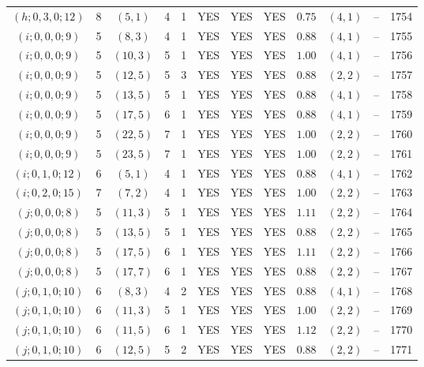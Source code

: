 \begin{longtable}{|c|c|c|c|c|c|c|c|c|c|c|c|}
$(h;0,3,0;12)$ & 8 & $(5,1)$ & 4 & 1 & YES & YES & YES & $0.75$ & $(4,1)$ & -- & 1754\\
$(i;0,0,0;9)$ & 5 & $(8,3)$ & 4 & 1 & YES & YES & YES & $0.88$ & $(4,1)$ & -- & 1755\\
$(i;0,0,0;9)$ & 5 & $(10,3)$ & 5 & 1 & YES & YES & YES & $1.00$ & $(4,1)$ & -- & 1756\\
$(i;0,0,0;9)$ & 5 & $(12,5)$ & 5 & 3 & YES & YES & YES & $0.88$ & $(2,2)$ & -- & 1757\\
$(i;0,0,0;9)$ & 5 & $(13,5)$ & 5 & 1 & YES & YES & YES & $0.88$ & $(4,1)$ & -- & 1758\\
$(i;0,0,0;9)$ & 5 & $(17,5)$ & 6 & 1 & YES & YES & YES & $0.88$ & $(4,1)$ & -- & 1759\\
$(i;0,0,0;9)$ & 5 & $(22,5)$ & 7 & 1 & YES & YES & YES & $1.00$ & $(2,2)$ & -- & 1760\\
$(i;0,0,0;9)$ & 5 & $(23,5)$ & 7 & 1 & YES & YES & YES & $1.00$ & $(2,2)$ & -- & 1761\\
$(i;0,1,0;12)$ & 6 & $(5,1)$ & 4 & 1 & YES & YES & YES & $0.88$ & $(4,1)$ & -- & 1762\\
$(i;0,2,0;15)$ & 7 & $(7,2)$ & 4 & 1 & YES & YES & YES & $1.00$ & $(2,2)$ & -- & 1763\\
$(j;0,0,0;8)$ & 5 & $(11,3)$ & 5 & 1 & YES & YES & YES & $1.11$ & $(2,2)$ & -- & 1764\\
$(j;0,0,0;8)$ & 5 & $(13,5)$ & 5 & 1 & YES & YES & YES & $0.88$ & $(2,2)$ & -- & 1765\\
$(j;0,0,0;8)$ & 5 & $(17,5)$ & 6 & 1 & YES & YES & YES & $1.11$ & $(2,2)$ & -- & 1766\\
$(j;0,0,0;8)$ & 5 & $(17,7)$ & 6 & 1 & YES & YES & YES & $0.88$ & $(2,2)$ & -- & 1767\\
$(j;0,1,0;10)$ & 6 & $(8,3)$ & 4 & 2 & YES & YES & YES & $0.88$ & $(4,1)$ & -- & 1768\\
$(j;0,1,0;10)$ & 6 & $(11,3)$ & 5 & 1 & YES & YES & YES & $1.00$ & $(2,2)$ & -- & 1769\\
$(j;0,1,0;10)$ & 6 & $(11,5)$ & 6 & 1 & YES & YES & YES & $1.12$ & $(2,2)$ & -- & 1770\\
$(j;0,1,0;10)$ & 6 & $(12,5)$ & 5 & 2 & YES & YES & YES & $0.88$ & $(2,2)$ & -- & 1771
\end{longtable}
